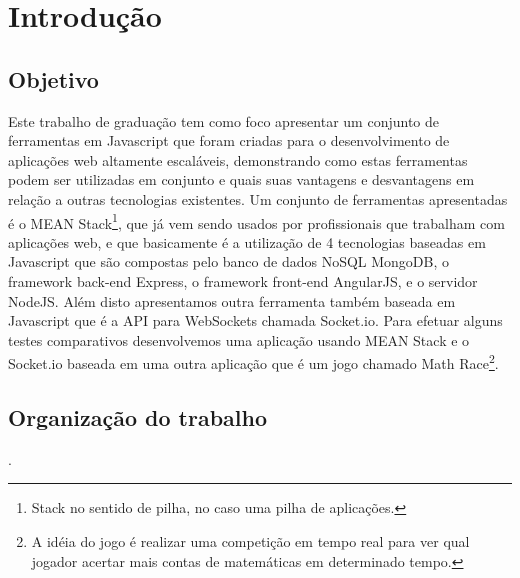 \chapter{Introdu\c{c}\~ao}
\label{Introducao}


\section{Objetivo}
Este trabalho de graduação tem como foco apresentar um conjunto de ferramentas em Javascript que foram criadas para o desenvolvimento de aplicações web altamente escaláveis, demonstrando como estas ferramentas podem ser utilizadas em conjunto e quais suas vantagens e desvantagens em relação a outras tecnologias existentes. 
Um conjunto de ferramentas apresentadas é o MEAN Stack\footnote{Stack no sentido de pilha, no caso uma pilha de aplicações.}, que já vem sendo usados por profissionais que trabalham com aplicações web, e que basicamente é a utilização de 4 tecnologias baseadas em Javascript que são compostas pelo banco de dados NoSQL MongoDB, o framework back-end Express, o framework front-end AngularJS, e o servidor NodeJS. Além disto apresentamos outra ferramenta também baseada em Javascript que é a API para WebSockets chamada Socket.io.
Para efetuar alguns testes comparativos desenvolvemos uma aplicação usando MEAN Stack e o Socket.io  baseada em uma outra aplicação que é um jogo chamado Math Race\footnote{A idéia do jogo é realizar uma competição em tempo real para ver qual jogador acertar mais contas de matemáticas em determinado tempo.}.


\section{Organização do trabalho}
.
  